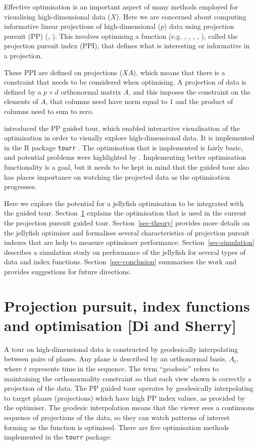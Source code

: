 \documentclass[
  number,
  preprint,
  3p]{elsarticle}
\begin{document}
Effective optimisation is an important aspect of many methods employed
for visualising high-dimensional data (\(X\)). Here we are concerned
about computing informative linear projections of high-dimensional
(\(p\)) data using projection pursuit (PP) (\citet{kr69}, \citet{FT74}).
This involves optimising a function (e.g. \citet{hall1989polynomial},
\citet{cook1993projection}, \citet{lee2010projection},
\citet{Loperfido2018}, \citet{Loperfido2020}), called the projection
pursuit index (PPI), that defines what is interesting or informative in
a projection.

These PPI are defined on projections (\(XA\)), which means that there is
a constraint that needs to be considered when optimising. A projection
of data is defined by a \(p\times d\) orthonormal matrix \(A\), and this
imposes the constraint on the elements of \(A\), that columns need have
norm equal to 1 and the product of columns need to sum to zero.

\citet{cook1995grand} introduced the PP guided tour, which enabled
interactive visualisation of the optimisation in order to visually
explore high-dimensional data. It is implemented in the R \citep{R}
package \texttt{tourr} \citep{tourr}. The optimisation that is
implemented is fairly basic, and potential problems were highlighted by
\citet{RJ-2021-105}. Implementing better optimisation functionality is a
goal, but it needs to be kept in mind that the guided tour also has
places importance on watching the projected data as the optimisation
progresses.

Here we explore the potential for a jellyfish optimisation to be
integrated with the guided tour. Section~\ref{sec-background} explains
the optimisation that is used in the current the projection pursuit
guided tour. Section~\ref{sec-theory} provides more details on the
jellyfish optimiser and formalises several characteristics of projection
pursuit indexes that are help to measure optimisaer performance.
Section~\ref{sec-simulation} describes a simulation study on performance
of the jellyfish for several types of data and index functions.
Section~\ref{sec-conclusion} summarises the work and provides
suggestions for future directions.

\section{Projection pursuit, index functions and optimisation {[}Di and
Sherry{]}}\label{sec-background}

A tour on high-dimensional data is constructed by geodesically
interpolating between pairs of planes. Any plane is described by an
orthonormal basis, \(A_t\), where \(t\) represents time in the sequence.
The term ``geodesic'' refers to maintaining the orthonormality
constraint so that each view shown is correctly a projection of the
data. The PP guided tour operates by geodesically interpolating to
target planes (projections) which have high PP index values, as provided
by the optimiser. The geodesic interpolation means that the viewer sees
a continuous sequence of projections of the data, so they can watch
patterns of interest forming as the function is optimised. There are
five optimisation methods implemented in the \texttt{tourr} package:
\end{document}
